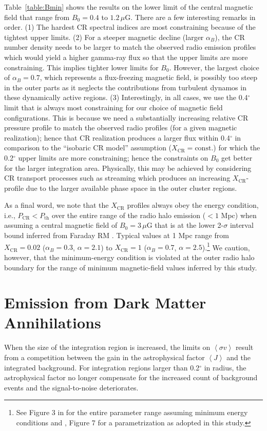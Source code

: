 \documentclass[12pt,manuscript]{aastex}
\newcommand{\expval}[1]{\left\langle #1 \right\rangle}
\newcommand{\rmn}{\mathrm}
\newcommand{\CR}{\mathrm{CR}}
\begin{document}
Table~\ref{table:Bmin} shows the results on the lower limit of the central magnetic field that range from $B_{0} = 0.4$ to $1.2\,\mu$G. There are a few interesting remarks in order. (1) The hardest CR spectral indices are most constraining because of the tightest upper limits. (2) For a steeper magnetic decline (larger $\alpha_{B}$), the CR number density needs to be larger to match the observed radio emission profiles which would yield a higher gamma-ray flux so that the upper limits are more constraining. This implies tighter lower limits for $B_{0}$. However, the largest choice of $\alpha_B=0.7$, which represents a flux-freezing magnetic field, is possibly too steep in the outer parts as it neglects the contributions from turbulent dynamos in these dynamically active regions. (3) Interestingly, in all cases, we use the 0.4$^{\circ}$ limit that is always most constraining for our choice of magnetic field configurations.  This is because we need a substantially increasing relative CR pressure profile to match the observed radio profiles (for a given magnetic realization); hence that CR realization produces a larger flux within 0.4$^{\circ}$ in comparison to the ``isobaric CR model'' assumption ($X_{\CR} = \rmn{const.}$) for which the 0.2$^{\circ}$ upper limits are more constraining; hence the constraints on $B_{0}$ get better for the larger integration area. Physically, this may be achieved by considering CR transport processes such as streaming which produces an increasing $X_{\CR}$-profile due to the larger available phase space in the outer cluster regions.

As a final word, we note that the $X_{\CR}$ profiles always obey the energy condition, i.e., $P_{\CR} < P_{\mathrm{th}}$ over the entire range of the radio halo emission ($< 1$ Mpc) when assuming a central magnetic field of $B_{0}=3\,\mu$G that is at the lower 2-$\sigma$ interval bound inferred from Faraday RM
\citep{article:Bonafede_etal:2010}. Typical values at 1 Mpc range from $X_{\CR} = 0.02$
($\alpha_{B}=0.3$, $\alpha=2.1$) to $X_{\CR} = 1$ ($\alpha_{B}=0.7$,
$\alpha=2.5$).\footnote{See Figure 3 in \citet{article:PfrommerEnsslin:2004a} for the entire parameter range assuming minimum energy conditions and \citet{article:PfrommerEnsslin:2004b}, Figure 7 for a parametrization as adopted in this study.} We caution, however, that the minimum-energy condition is violated at the outer radio halo boundary for the range of minimum magnetic-field values inferred by this study.

\section{Emission from Dark Matter Annihilations}
When the size of the integration region is increased, the limits on $\expval{\sigma v}$ result from a competition between the gain in the astrophysical factor $\expval{J}$ and the integrated background. For integration regions larger than 0.2$^{\circ}$ in radius, the astrophysical factor no longer compensate for the increased count of background events and the signal-to-noise deteriorates. 
\end{document}
